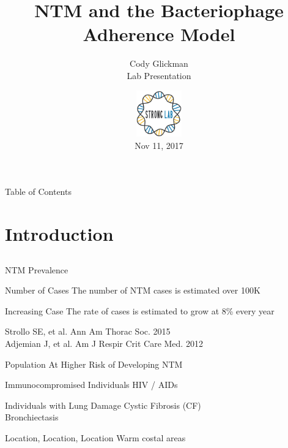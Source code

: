 \documentclass[11pt]{beamer}
\author{Cody Glickman \\ Lab Presentation}
\title{NTM and the Bacteriophage Adherence Model}
\date{ \includegraphics[height=2cm, width=2cm]{lablogo.png} \\ Nov 11, 2017}
\begin{document}
	\maketitle
	\begin{frame}{Table of Contents}
		\tableofcontents
	\end{frame}
	
	
\section{Introduction}
\subsection{}

	\begin{frame}{NTM Prevalence}
	
		\begin{block}{Number of Cases}
		The number of NTM cases is estimated over 100K
		\end{block}
		
		\begin{block}{Increasing Case}
		The rate of cases is estimated to grow at 8\% every year
		\end{block}
		
		\begin{block}
		
		\end{block}
		
	\tiny{Strollo SE, et al. Ann Am Thorac Soc. 2015 \\
	Adjemian J, et al. Am J Respir Crit Care Med. 2012}
	
	\end{frame}
	
	\begin{frame}{Population At Higher Risk of Developing NTM}
	
		\begin{block}{Immunocompromised Individuals}
		 HIV / AIDs 
		 \end{block}
		 
		 \begin{block}{Individuals with Lung Damage}
		 Cystic Fibrosis (CF) \\ Bronchiectasis 
		 \end{block}
		 
		 \begin{block}{Location, Location, Location}
		 Warm costal areas
		 \end{block}
		 
	\end{frame}
	
\end{document}
